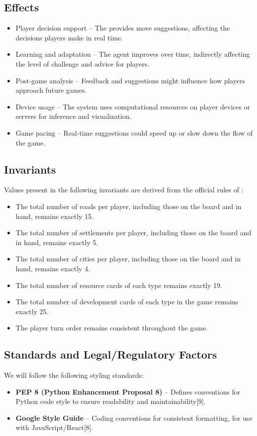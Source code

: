 \documentclass{article}
\begin{document}
\subsection{Effects}\label{subsec:effects}
\begin{itemize}
    \item {Player decision support} – The \AI{} provides move suggestions, affecting the decisions players make in real time.
    \item {Learning and adaptation} – The \RL{} agent improves over time, indirectly affecting the level of challenge and advice for players.
    \item {Post-game analysis} – Feedback and suggestions might influence how players approach future games.
    \item {Device usage} – The system uses computational resources on player devices or servers for inference and visualization.
    \item {Game pacing} – Real-time suggestions could speed up or slow down the flow of the game.
\end{itemize}

\subsection{Invariants}\label{subsec:invariants}
Values present in the following invariants are derived from the official rules of \emph{\Catan{}}:
\begin{itemize}
    \item The total number of roads per player, including those on the board and in hand, remains exactly 15.
    \item The total number of settlements per player, including those on the board and in hand, remains exactly 5.
    \item The total number of cities per player, including those on the board and in hand, remains exactly 4.
    \item The total number of resource cards of each type remains exactly 19.
    \item The total number of development cards of each type in the game remains exactly 25.
    \item The player turn order remains consistent throughout the game.
\end{itemize}


\subsection{Standards and Legal/Regulatory Factors}
We will follow the following styling standards:
\begin{itemize}
    \item \textbf{PEP 8 (Python Enhancement Proposal 8)} – Defines conventions for Python code style to ensure readability and maintainability[9].
    \item \textbf{Google Style Guide} – Coding conventions for consistent formatting, for use with JavaScript/React[8].
\end{itemize}
\end{document}
